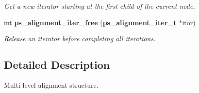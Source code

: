 \begin{DoxyCompactItemize}
\begin{DoxyCompactList}\small\item\em Get a new iterator starting at the first child of the current node. \end{DoxyCompactList}\item 
int {\bf ps\+\_\+alignment\+\_\+iter\+\_\+free} ({\bf ps\+\_\+alignment\+\_\+iter\+\_\+t} $\ast$itor)\label{ps__alignment_8h_a80e0020539ea622706bf63883e24d301}

\begin{DoxyCompactList}\small\item\em Release an iterator before completing all iterations. \end{DoxyCompactList}\end{DoxyCompactItemize}


\subsection{Detailed Description}
Multi-\/level alignment structure. 

